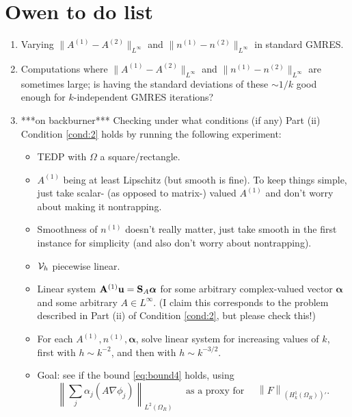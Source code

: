 \documentclass[10pt]{article}%
\numberwithin{equation}{section}
\newcommand{\beqs}{\begin{equation*}}
\newcommand{\eeqs}{\end{equation*}}
\newcommand{\bit}{\begin{itemize}}
\newcommand{\eit}{\end{itemize}}
\newcommand{\ben}{\begin{enumerate}}
\newcommand{\een}{\end{enumerate}}
\newcommand{\cV}{{\cal V}}
\newcommand{\balpha}{{\boldsymbol{\alpha}}}
\newcommand{\bu}{\mathbf{u}}
\newcommand{\OR}{{\Omega_R}}
\newcommand{\HoDkk}{{H^1_{k}(\domain_R)}}
\newcommand*{\N}[1]{\left\|#1\right\|}
\newcommand{\domain}{\Omega}
\newcommand{\matrixS}{{\bf S}}
\newcommand{\matrixAo}{{\bf A}^{(1)}}
\newcommand{\coeffAo}{A^{(1)}}
\newcommand{\coeffAt}{A^{(2)}}
\newcommand{\coeffno}{n^{(1)}}
\newcommand{\coeffnt}{n^{(2)}}
\begin{document}
\section*{Owen to do list}
\ben
\item Varying  $\|\coeffAo-\coeffAt\|_{L^\infty}$ and $\|\coeffno-\coeffnt\|_{L^\infty}$ in standard GMRES.
\item Computations where $\|\coeffAo-\coeffAt\|_{L^\infty}$ and $\|\coeffno-\coeffnt\|_{L^\infty}$ are sometimes large; is having the standard deviations of these $\sim 1/k$ good enough for $k$-independent GMRES iterations?
\item ***on backburner*** Checking under what conditions (if any) Part (ii) Condition \ref{cond:2} holds by running the following experiment:
\bit
\item TEDP with $\Omega$ a square/rectangle.
\item $\coeffAo$ being at least Lipschitz (but smooth is fine). To keep things simple, just take scalar- (as opposed to matrix-) valued $\coeffAo$ and don't worry about making it nontrapping.
\item Smoothness of $\coeffno$ doesn't really matter, just take smooth in the first instance for simplicity (and also don't worry about nontrapping).
\item $\cV_h$ piecewise linear.
\item Linear system $\matrixAo \bu = \matrixS_{A} \balpha$ for some arbitrary complex-valued vector $\balpha$ and some arbitrary $A\in L^\infty$. (I claim this corresponds to the problem described in Part (ii) of Condition \ref{cond:2},  but please check this!)
\item For each $\coeffAo, \coeffno, \balpha$, solve linear system for increasing values of $k$, first with $h\sim k^{-2}$, and then with $h\sim k^{-3/2}$.
\item Goal: see if the bound \eqref{eq:bound4} holds, using 
\beqs
\N{\sum_j \alpha_j (A\nabla \phi_j)}_{L^2(\OR)} \quad \text{ as a proxy for } \quad \N{F}_{(\HoDkk)'}.
\eeqs
\eit
\een
\end{document}
